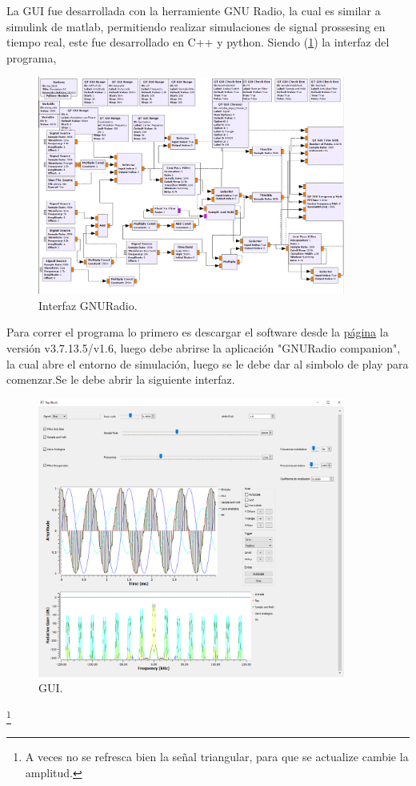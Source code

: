 %

%

La GUI fue desarrollada con la herramiente GNU Radio, la cual es similar a simulink de matlab, permitiendo realizar simulaciones de signal prossesing en tiempo real, este fue desarrollado en C++ y python.
Siendo (\ref{fig:gnu}) la interfaz del programa,
 \begin{figure}[H]
	\centering
	\includegraphics[width=0.9\textwidth]{ImagenesEjercicio5/gnuradio.PNG}
\caption{Interfaz GNURadio.}
	\label{fig:gnu}
\end{figure}
Para correr el programa lo primero es descargar el software desde la \href{http://www.gcndevelopment.com/gnuradio/downloads.htm}{página} la versión v3.7.13.5/v1.6, luego debe abrirse la aplicación "GNURadio companion", la cual abre el entorno de simulación, luego se le debe dar al simbolo de play para comenzar.Se le debe abrir la siguiente interfaz.
 \begin{figure}[H]
	\centering
	\includegraphics[width=0.9\textwidth]{ImagenesEjercicio5/gui.PNG}
\caption{GUI.}
	\label{fig:GUI}
\end{figure}
\footnote{A veces no se refresca bien la señal triangular, para que se actualize cambie la amplitud.}
%